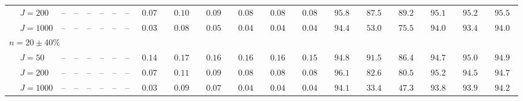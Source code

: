 \begin{sidewaystable}
\begin{threeparttable}
\begin{tabular}{llcccccccccccccccccc}
 & \nopagebreak $\;J=200$  & \phantom{00}--\phantom{00} & \phantom{00}--\phantom{00} & \phantom{00}--\phantom{00} & \phantom{00}--\phantom{00} & \phantom{00}--\phantom{00} & \phantom{00}--\phantom{00} & $\phantom{0}0.07\phantom{0}$ & $\phantom{0}0.10\phantom{0}$ & $\phantom{0}0.09\phantom{0}$ & $\phantom{0}0.08\phantom{0}$ & $\phantom{0}0.08\phantom{0}$ & $\phantom{0}0.08\phantom{0}$ & $\phantom{0}95.8\phantom{0}$ & $\phantom{0}87.5\phantom{0}$ & $\phantom{0}89.2\phantom{0}$ & $\phantom{0}95.1\phantom{0}$ & $\phantom{0}95.2\phantom{0}$ & $\phantom{0}95.5\phantom{0}$ \\
 & \nopagebreak $\;J=1000$  & \phantom{00}--\phantom{00} & \phantom{00}--\phantom{00} & \phantom{00}--\phantom{00} & \phantom{00}--\phantom{00} & \phantom{00}--\phantom{00} & \phantom{00}--\phantom{00} & $\phantom{0}0.03\phantom{0}$ & $\phantom{0}0.08\phantom{0}$ & $\phantom{0}0.05\phantom{0}$ & $\phantom{0}0.04\phantom{0}$ & $\phantom{0}0.04\phantom{0}$ & $\phantom{0}0.04\phantom{0}$ & $\phantom{0}94.4\phantom{0}$ & $\phantom{0}53.0\phantom{0}$ & $\phantom{0}75.5\phantom{0}$ & $\phantom{0}94.0\phantom{0}$ & $\phantom{0}93.4\phantom{0}$ & $\phantom{0}94.0\phantom{0}$ \\
\multicolumn{4}{l}{$n=20\pm40\%$ } \\  & \nopagebreak $\;J=50$  & \phantom{00}--\phantom{00} & \phantom{00}--\phantom{00} & \phantom{00}--\phantom{00} & \phantom{00}--\phantom{00} & \phantom{00}--\phantom{00} & \phantom{00}--\phantom{00} & $\phantom{0}0.14\phantom{0}$ & $\phantom{0}0.17\phantom{0}$ & $\phantom{0}0.16\phantom{0}$ & $\phantom{0}0.16\phantom{0}$ & $\phantom{0}0.16\phantom{0}$ & $\phantom{0}0.15\phantom{0}$ & $\phantom{0}94.8\phantom{0}$ & $\phantom{0}91.5\phantom{0}$ & $\phantom{0}86.4\phantom{0}$ & $\phantom{0}94.7\phantom{0}$ & $\phantom{0}95.0\phantom{0}$ & $\phantom{0}94.9\phantom{0}$ \\
 & \nopagebreak $\;J=200$  & \phantom{00}--\phantom{00} & \phantom{00}--\phantom{00} & \phantom{00}--\phantom{00} & \phantom{00}--\phantom{00} & \phantom{00}--\phantom{00} & \phantom{00}--\phantom{00} & $\phantom{0}0.07\phantom{0}$ & $\phantom{0}0.11\phantom{0}$ & $\phantom{0}0.09\phantom{0}$ & $\phantom{0}0.08\phantom{0}$ & $\phantom{0}0.08\phantom{0}$ & $\phantom{0}0.08\phantom{0}$ & $\phantom{0}96.1\phantom{0}$ & $\phantom{0}82.6\phantom{0}$ & $\phantom{0}80.5\phantom{0}$ & $\phantom{0}95.2\phantom{0}$ & $\phantom{0}94.5\phantom{0}$ & $\phantom{0}94.7\phantom{0}$ \\
 & \nopagebreak $\;J=1000$  & \phantom{00}--\phantom{00} & \phantom{00}--\phantom{00} & \phantom{00}--\phantom{00} & \phantom{00}--\phantom{00} & \phantom{00}--\phantom{00} & \phantom{00}--\phantom{00} & $\phantom{0}0.03\phantom{0}$ & $\phantom{0}0.09\phantom{0}$ & $\phantom{0}0.07\phantom{0}$ & $\phantom{0}0.04\phantom{0}$ & $\phantom{0}0.04\phantom{0}$ & $\phantom{0}0.04\phantom{0}$ & $\phantom{0}94.1\phantom{0}$ & $\phantom{0}33.4\phantom{0}$ & $\phantom{0}47.3\phantom{0}$ & $\phantom{0}93.8\phantom{0}$ & $\phantom{0}93.9\phantom{0}$ & $\phantom{0}94.2\phantom{0}$ \\

\end{tabular}
\end{threeparttable}
\end{sidewaystable}
